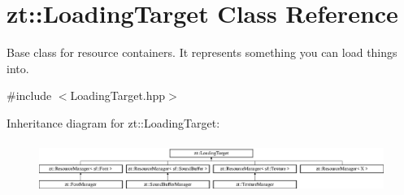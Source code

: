 \hypertarget{classzt_1_1_loading_target}{}\section{zt\+:\+:Loading\+Target Class Reference}
\label{classzt_1_1_loading_target}


Base class for resource containers. It represents something you can load things into.  




{\ttfamily \#include $<$Loading\+Target.\+hpp$>$}

Inheritance diagram for zt\+:\+:Loading\+Target\+:\begin{figure}[H]
\begin{center}
\leavevmode
\includegraphics[height=1.673307cm]{classzt_1_1_loading_target}
\end{center}
\end{figure}

